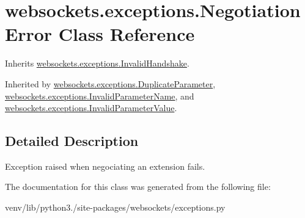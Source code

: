 \hypertarget{classwebsockets_1_1exceptions_1_1_negotiation_error}{}\section{websockets.\+exceptions.\+Negotiation\+Error Class Reference}
\label{classwebsockets_1_1exceptions_1_1_negotiation_error}


Inherits \hyperlink{classwebsockets_1_1exceptions_1_1_invalid_handshake}{websockets.\+exceptions.\+Invalid\+Handshake}.



Inherited by \hyperlink{classwebsockets_1_1exceptions_1_1_duplicate_parameter}{websockets.\+exceptions.\+Duplicate\+Parameter}, \hyperlink{classwebsockets_1_1exceptions_1_1_invalid_parameter_name}{websockets.\+exceptions.\+Invalid\+Parameter\+Name}, and \hyperlink{classwebsockets_1_1exceptions_1_1_invalid_parameter_value}{websockets.\+exceptions.\+Invalid\+Parameter\+Value}.



\subsection{Detailed Description}
\begin{DoxyVerb}Exception raised when negociating an extension fails.\end{DoxyVerb}
 

The documentation for this class was generated from the following file\+:\begin{DoxyCompactItemize}
\item 
venv/lib/python3./site-\/packages/websockets/exceptions.\+py\end{DoxyCompactItemize}
